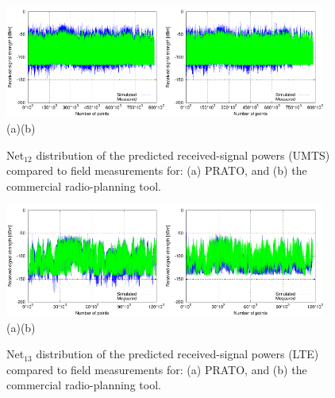 \begin{figure}[h]
\centering

\includegraphics[width=0.47\textwidth]{08-real_network_planning/img/umts_prato_rcv_pwr}\includegraphics[width=0.47\textwidth]{08-real_network_planning/img/umts_tcpu_rcv_pwr}\\\hspace{0.4cm}(a)\hspace{6.7cm}(b)

\caption{Net$_{12}$ distribution of the predicted received-signal powers (UMTS)
compared to field measurements for: (a) PRATO, and (b) the commercial
radio-planning tool.\label{fig:08-Received_signal_power-UMTS}}
\end{figure}


\begin{figure}[H]
\centering

\includegraphics[width=0.47\textwidth]{08-real_network_planning/img/lte_prato_rcv_pwr}\includegraphics[width=0.47\textwidth]{08-real_network_planning/img/lte_tcpu_rcv_pwr}\\\hspace{0.4cm}(a)\hspace{6.7cm}(b)

\caption{Net$_{13}$ distribution of the predicted received-signal powers (LTE)
compared to field measurements for: (a) PRATO, and (b) the commercial
radio-planning tool.\label{fig:08-Received_signal_power-LTE}}
\end{figure}


